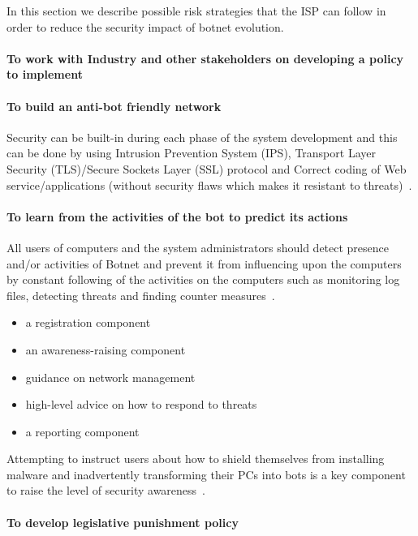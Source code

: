 In this section we describe possible risk strategies that the ISP can follow in order to reduce the security impact of botnet evolution.
\paragraph{To work with Industry and other stakeholders on developing a policy to implement}


\paragraph{To build an anti-bot friendly network}

Security can be built-in during each phase of the system development and this can be done by using Intrusion Prevention System (IPS), Transport Layer Security (TLS)/Secure Sockets Layer (SSL) protocol and Correct coding of Web service/applications (without security flaws which makes it resistant to threats)~\cite{stankovic2009defense}.


\paragraph{To learn from the activities of the bot to predict its actions}
All users of computers and the system administrators should detect presence and/or activities of Botnet and prevent it from influencing upon the computers by constant following of the activities on the computers such as monitoring log files, detecting threats and finding counter measures~\cite{stankovic2009defense}.

\begin{itemize}
	\item a registration component
	\item an awareness-raising component
	\item guidance on network management
	\item high-level advice on how to respond to threats
	\item a reporting component
\end{itemize}

Attempting to instruct users about how to shield themselves from installing malware and inadvertently transforming their PCs into bots is a key component to raise the level of security awareness~\cite{stankovic2009defense}.


\paragraph{To develop legislative punishment policy}

